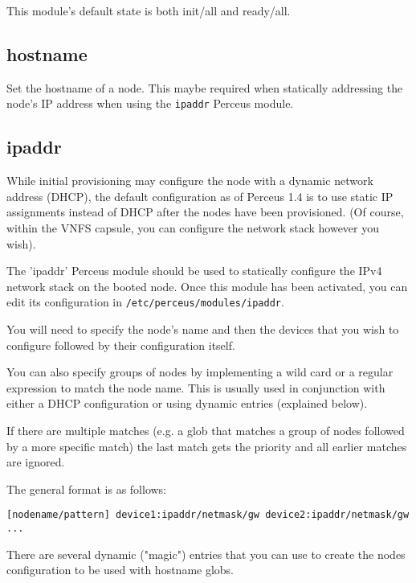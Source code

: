 \documentclass[10pt,letterpaper]{report}
\begin{document}
This module's default state is both init/all and ready/all.

\subsection{hostname}
Set the hostname of a node. This maybe required when statically addressing the
node's IP address when using the {\tt ipaddr} Perceus module.

\subsection{ipaddr}

While initial provisioning may configure the node with a dynamic network
address (DHCP), the default configuration as of Perceus 1.4 is to use static
IP assignments instead of DHCP after the nodes have been provisioned.  (Of
course, within the VNFS capsule, you can configure the network stack however
you wish).

The 'ipaddr' Perceus module should be used to statically configure the IPv4
network stack on the booted node.  Once this module has been activated, you
can edit its configuration in {\tt /etc/perceus/modules/ipaddr}.

You will need to specify the node's name and then the devices that you wish
to configure followed by their configuration itself.

You can also specify groups of nodes by implementing a wild card or a regular
expression to match the node name. This is usually used in conjunction with
either a DHCP configuration or using dynamic entries (explained below).

If there are multiple matches (e.g. a glob that matches a group of nodes
followed by a more specific match) the last match gets the priority and all
earlier matches are ignored.

The general format is as follows:

\begin{verbatim}
[nodename/pattern] device1:ipaddr/netmask/gw device2:ipaddr/netmask/gw ...
\end{verbatim}

There are several dynamic ("magic") entries that you can use to create the
nodes configuration to be used with hostname globs.
\end{document}
